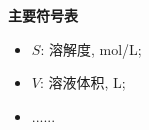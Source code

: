 \clearpage
{}
{}
\begingroup
    \centering
    {\heiti\bfseries 主要符号表}
    \par
    \vspace{\baselineskip}
\endgroup

\begingroup
    \songti
    \setlength{\baselineskip}{25pt}
    \begin{itemize}[label={}, leftmargin=0pt]
        \item $S$: 溶解度, mol/L;
        \item $V$: 溶液体积, L;
        \item ......
    \end{itemize}
\endgroup

\clearpage
\mbox{}\clearpage %
